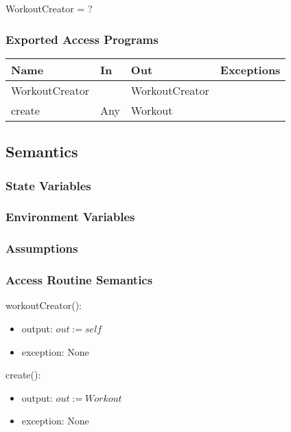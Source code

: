 \documentclass[12pt, titlepage]{article}
\begin{document}
WorkoutCreator = ?

\subsubsection{Exported Access Programs}

\begin{center}
	\begin{tabular}{p{2cm} p{4cm} p{4cm} p{2cm}}
		\hline
		\textbf{Name} & \textbf{In} & \textbf{Out} & \textbf{Exceptions} \\
		\hline
		WorkoutCreator &  & WorkoutCreator &  \\
		create & Any & Workout &  \\
		\hline
	\end{tabular}
\end{center}

\subsection{Semantics}

\subsubsection{State Variables}

\subsubsection{Environment Variables}

\subsubsection{Assumptions}

\subsubsection{Access Routine Semantics}

\noindent workoutCreator():
\begin{itemize}
	\item output: $out := self$
	\item exception: None
\end{itemize}

\noindent create():
\begin{itemize}
	\item output: $out := Workout$
	\item exception: None
\end{itemize}
\end{document}

